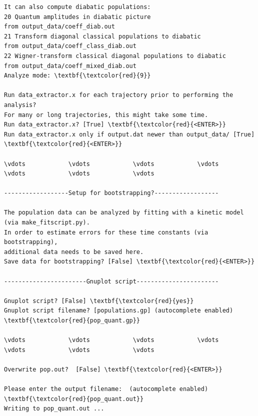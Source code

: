 \documentclass[a4paper,11pt,DIV=15,openany]{scrbook}
\begin{document}
\begin{oframed}
\begin{Verbatim}[commandchars=\\\{\}]
It can also compute diabatic populations:
20 Quantum amplitudes in diabatic picture                              from output_data/coeff_diab.out
21 Transform diagonal classical populations to diabatic                from output_data/coeff_class_diab.out
22 Wigner-transform classical diagonal populations to diabatic         from output_data/coeff_mixed_diab.out
Analyze mode: \textbf{\textcolor{red}{9}}

Run data_extractor.x for each trajectory prior to performing the analysis?
For many or long trajectories, this might take some time.
Run data_extractor.x? [True] \textbf{\textcolor{red}{<ENTER>}}
Run data_extractor.x only if output.dat newer than output_data/ [True] \textbf{\textcolor{red}{<ENTER>}}

\vdots            \vdots            \vdots            \vdots            \vdots            \vdots            \vdots            

------------------Setup for bootstrapping?------------------

The population data can be analyzed by fitting with a kinetic model (via make_fitscript.py). 
In order to estimate errors for these time constants (via bootstrapping), 
additional data needs to be saved here.
Save data for bootstrapping? [False] \textbf{\textcolor{red}{<ENTER>}}

-----------------------Gnuplot script-----------------------

Gnuplot script? [False] \textbf{\textcolor{red}{yes}}
Gnuplot script filename? [populations.gp] (autocomplete enabled) \textbf{\textcolor{red}{pop_quant.gp}}

\vdots            \vdots            \vdots            \vdots            \vdots            \vdots            \vdots            

Overwrite pop.out?  [False] \textbf{\textcolor{red}{<ENTER>}}

Please enter the output filename:  (autocomplete enabled) \textbf{\textcolor{red}{pop_quant.out}}
Writing to pop_quant.out ...
\end{Verbatim}
\end{oframed}

\normalsize
\end{document}
